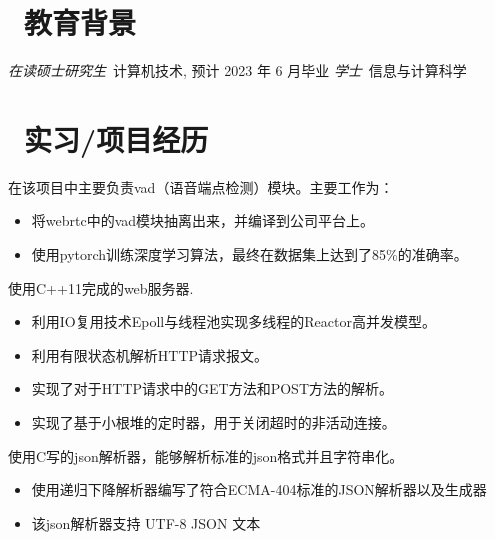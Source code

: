 \documentclass{resume}
\begin{document}



\section{\faGraduationCap\  教育背景}
\textit{在读硕士研究生}\ 计算机技术, 预计 2023 年 6 月毕业
\textit{学士}\ 信息与计算科学

\section{\faUsers\ 实习/项目经历}
\begin{onehalfspacing}
    在该项目中主要负责vad（语音端点检测）模块。主要工作为：
    \begin{itemize}
        \item 将webrtc中的vad模块抽离出来，并编译到公司平台上。
        \item 使用pytorch训练深度学习算法，最终在数据集上达到了85\%的准确率。
    \end{itemize}
\end{onehalfspacing}


\begin{onehalfspacing}
    使用C++11完成的web服务器.
    \begin{itemize}
        \item 利用IO复用技术Epoll与线程池实现多线程的Reactor高并发模型。
        \item 利用有限状态机解析HTTP请求报文。
        \item 实现了对于HTTP请求中的GET方法和POST方法的解析。
        \item 实现了基于小根堆的定时器，用于关闭超时的非活动连接。
    \end{itemize}
\end{onehalfspacing}

\begin{onehalfspacing}
    使用C写的json解析器，能够解析标准的json格式并且字符串化。
    \begin{itemize}
        \item 使用递归下降解析器编写了符合ECMA-404标准的JSON解析器以及生成器
        \item 该json解析器支持 UTF-8 JSON 文本
    \end{itemize}
\end{onehalfspacing}
\end{document}
